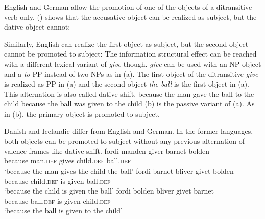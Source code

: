 English and German allow the promotion of one of the objects of a ditransitive verb only. ()
shows that the accusative object can be realized as subject, but the dative object cannot:
\eal
{}
\zl

\noindent
Similarly, English can realize the first object as subject, but the second object cannot be promoted
to subject:
\eal
{}
\zl
The information structural effect can be reached with a different lexical variant of \emph{give}
though. \emph{give} can be used with an NP object and a \emph{to} PP instead of two NPs as in
(a). The first object of the ditransitive \emph{give} is realized as PP in (a) and the
second object \emph{the ball} is the first object in (a). This alternation is also called dative-shift.
\eal
\ex because the man gave the ball to the child
\ex because the ball was given to the child
\zl
(b) is the passive variant of (a). As in (b), the primary object is promoted
to subject.

Danish and Icelandic differ from English and German. In the former languages, both objects can be
promoted to subject without any previous alternation of valence frames like dative shift.
\eal
\ex\label{ex-fordi-manden-giver-barnet-bolden} 
\gll fordi manden giver barnet bolden\\ 
     because man.\textsc{def} gives child.\textsc{def} ball.\textsc{def}\\\danish
\glt `because the man gives the child the ball'
\ex\label{ex-child-was-given-ball-danish}
\gll fordi barnet bliver givet bolden\\ 
     because child.\textsc{def} is given ball.\textsc{def}\\
\glt `because the child is given the ball'
\ex\label{ex-ball-was-given-child-danish}
\gll fordi bolden bliver givet barnet\\ 
     because ball.\textsc{def} is given child.\textsc{def}\\
\glt `because the ball is given to the child'
\zl

